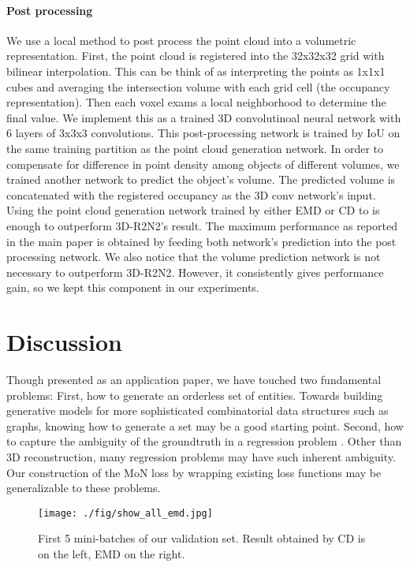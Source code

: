 \documentclass[10pt,twocolumn,letterpaper]{article}
\begin{document}
\paragraph{Post processing}
We use a local method to post process the point cloud into a volumetric representation. First, the point cloud is registered into the 32x32x32 grid with bilinear interpolation. This can be think of as interpreting the points as 1x1x1 cubes and averaging the intersection volume with each grid cell (the occupancy representation). Then each voxel exams a local neighborhood to determine the final value. We implement this as a trained 3D convolutinoal neural network with 6 layers of 3x3x3 convolutions. This post-processing network is trained by IoU on the same training partition as the point cloud generation network. In order to compensate for difference in point density among objects of different volumes, we trained another network to predict the object's volume. The predicted volume is concatenated with the registered occupancy as the 3D conv network's input. Using the point cloud generation network trained by either EMD or CD to is enough to outperform 3D-R2N2's result. The maximum performance as reported in the main paper is obtained by feeding both     network's prediction into the post processing network. We also notice that the volume prediction network is not necessary to outperform 3D-R2N2. However, it consistently gives performance gain, so we kept this component in our experiments.


\section{Discussion}
Though presented as an application paper, we have touched two fundamental problems: First, how to generate an orderless set of entities. Towards building generative models for more sophisticated combinatorial data structures such as graphs, knowing how to generate a set may be a good starting point. Second, how to capture the ambiguity of the groundtruth in a regression problem . Other than 3D reconstruction, many regression problems may have such inherent ambiguity. Our construction of the MoN loss by wrapping existing loss functions may be generalizable to these problems.


\begin{figure*}
	\centering
	\texttt{[image: ./fig/show\_all\_emd.jpg]}
	\caption{First 5 mini-batches of our validation set. Result obtained by CD is on the left, EMD on the right.}
	\label{fig:show_all}
\end{figure*}


{

}
\end{document}
